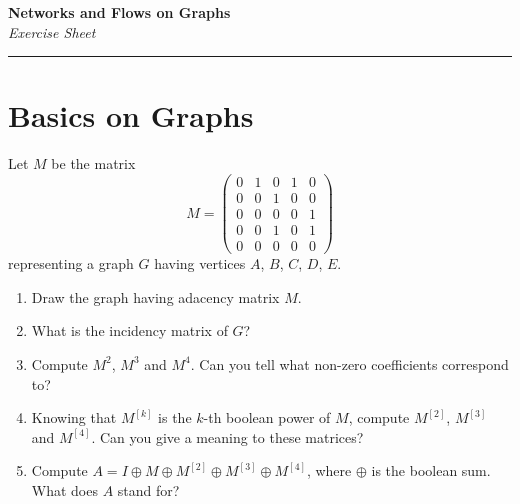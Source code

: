 \documentclass[11pt,a4paper]{article}
\begin{document}
\begin{center}
  {\Large \textbf{Networks and Flows on Graphs}}\\
  \vspace{10pt}
  {\Large \textit{Exercise Sheet}}
\end{center}
\rule{\textwidth}{2pt}
\vspace{\baselineskip}

\section{Basics on Graphs}

\begin{question}[subtitle={Adjacency and Incidence Matrices}]
  Let $M$ be the matrix
  \[
  M = \begin{pmatrix}
    0 & 1 & 0 & 1 & 0 \\
    0 & 0 & 1 & 0 & 0 \\
    0 & 0 & 0 & 0 & 1 \\
    0 & 0 & 1 & 0 & 1 \\
    0 & 0 & 0 & 0 & 0
  \end{pmatrix}
  \]
  representing a graph $G$ having vertices $A$, $B$, $C$, $D$, $E$. 
  \begin{enumerate}
  \item Draw the graph having adacency matrix $M$.
  \item What is the incidency matrix of $G$?
  \item Compute $M^2$, $M^3$ and $M^4$. Can you tell what non-zero
    coefficients correspond to?
  \item Knowing that $M^{[k]}$ is the $k$-th boolean power of $M$,
    compute $M^{[2]}$, $M^{[3]}$ and $M^{[4]}$. Can you give a meaning
    to these matrices?
  \item Compute
    $A = I \oplus M \oplus M^{[2]} \oplus M^{[3]} \oplus M^{[4]}$,
    where $\oplus$ is the boolean sum. What does $A$ stand for?
  \end{enumerate}
\end{question}
\end{document}
